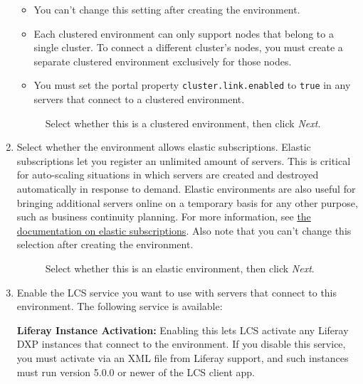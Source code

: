 \begin{enumerate}
  \begin{itemize}
  \tightlist
  \item
    You can't change this setting after creating the environment.
  \item
    Each clustered environment can only support nodes that belong to a
    single cluster. To connect a different cluster's nodes, you must
    create a separate clustered environment exclusively for those nodes.
  \item
    You must set the portal property \texttt{cluster.link.enabled} to
    \texttt{true} in any servers that connect to a clustered
    environment.
  \end{itemize}

  \begin{figure}
  \centering
  \caption{Select whether this is a clustered environment, then click
  \emph{Next}.}
  \end{figure}
\item
  Select whether the environment allows elastic subscriptions. Elastic
  subscriptions let you register an unlimited amount of servers. This is
  critical for auto-scaling situations in which servers are created and
  destroyed automatically in response to demand. Elastic environments
  are also useful for bringing additional servers online on a temporary
  basis for any other purpose, such as business continuity planning. For
  more information, see
  \href{/docs/7-2/deploy/-/knowledge_base/d/managing-liferay-dxp-subscriptions\#elastic-subscriptions}{the
  documentation on elastic subscriptions}. Also note that you can't
  change this selection after creating the environment.

  \begin{figure}
  \centering
  \caption{Select whether this is an elastic environment, then click
  \emph{Next}.}
  \end{figure}
\item
  Enable the LCS service you want to use with servers that connect to
  this environment. The following service is available:

  \textbf{Liferay Instance Activation:} Enabling this lets LCS activate
  any Liferay DXP instances that connect to the environment. If you
  disable this service, you must activate via an XML file from Liferay
  support, and such instances must run version 5.0.0 or newer of the LCS
  client app.


\end{enumerate}

